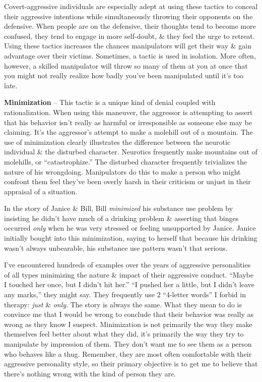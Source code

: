 \documentclass{article}
\numberwithin{equation}{section}
\begin{document}
Covert-aggressive individuals are especially adept at using these tactics to conceal their aggressive intentions while simultaneously throwing their opponents on the defensive. When people are on the defensive, their thoughts tend to become more confused, they tend to engage in more self-doubt, \& they feel the urge to retreat. Using these tactics increases the chances manipulators will get their way \& gain advantage over their victims. Sometimes, a tactic is used in isolation. More often, however, a skilled manipulator will throw so many of them at you at once that you might not really realize how badly you've been manipulated until it's too late.

\textbf{Minimization} -- This tactic is a unique kind of denial coupled with rationalization. When using this maneuver, the aggressor is attempting to assert that his behavior isn't really as harmful or irresponsible as someone else may be claiming. It's the aggressor's attempt to make a molehill out of a mountain. The use of minimization clearly illustrates the difference between the neurotic individual \& the disturbed character. Neurotics frequently make mountains out of molehills, or ``catastrophize.'' The disturbed character frequently trivializes the nature of his wrongdoing. Manipulators do this to make a person who might confront them feel they've been overly harsh in their criticism or unjust in their appraisal of a situation.

In the story of Janice \& Bill, Bill \textit{minimized} his substance use problem by insisting he didn't have much of a drinking problem \& asserting that binges occurred \textit{only} when he was very stressed or feeling unsupported by Janice. Janice initially bought into this minimization, saying to herself that because his drinking wasn't always unbearable, his substance use pattern wasn't that serious.

I've encountered hundreds of examples over the years of aggressive personalities of all types minimizing the nature \& impact of their aggressive conduct. ``Maybe I touched her once, but I didn't hit her.'' ``I pushed her a little, but I didn't leave any marks,'' they might say. They frequently use 2 ``4-letter words'' I forbid in therapy: \textit{just} \& \textit{only}. The story is always the same. What they mean to do is convince me that I would be wrong to conclude that their behavior was really as wrong as they know I suspect. Minimization is not primarily the way they make themselves feel better about what they did, it's primarily the way they try to manipulate by impression of them. They don't want me to see them as a person who behaves like a thug. Remember, they are most often comfortable with their aggressive personality style, so their primary objective is to get me to believe that there's nothing wrong with the kind of person they are.
\end{document}
